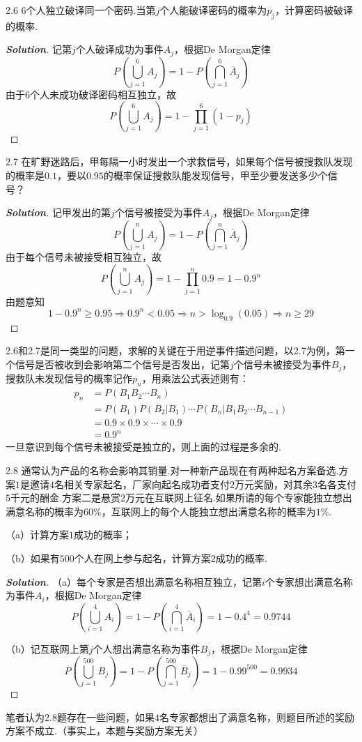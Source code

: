 \documentclass[10pt, a4paper, oneside]{ctexart}
\newenvironment{solution}{\begin{proof}[\bf Solution]}{\end{proof}}
\begin{document}
2.6 $6$个人独立破译同一个密码.当第$j$个人能破译密码的概率为$p_j$，计算密码被破译的概率.
\begin{solution}
记第$j$个人破译成功为事件$A_j$，根据De Morgan定律
\[P(\bigcup\limits_{j = 1}^6 {{A_j}} ) = 1 - P(\bigcap\limits_{j = 1}^6 {{{\overline A }_j}} )\]
由于$6$个人未成功破译密码相互独立，故
\[P(\bigcup\limits_{j = 1}^6 {{A_j}} ) = 1 - \prod\limits_{j = 1}^6 {(1 - {p_j})} \]
\end{solution}

2.7 在旷野迷路后，甲每隔一小时发出一个求救信号，如果每个信号被搜救队发现的概率是$0.1$，要以$0.95$的概率保证搜救队能发现信号，甲至少要发送多少个信号？
\begin{solution}
记甲发出的第$j$个信号被接受为事件$A_j$，根据De Morgan定律
\[P(\bigcup\limits_{j = 1}^n {{A_j}} ) = 1 - P(\bigcap\limits_{j = 1}^n {{{\bar A}_j}} )\]
由于每个信号未被接受相互独立，故
\[P(\bigcup\limits_{j = 1}^n {{A_j}} ) = 1 - \prod\limits_{j = 1}^n {0.9}  = 1 - {0.9^n}\]
由题意知
\[1 - {0.9^n} \geqslant 0.95 \Rightarrow {0.9^n} < 0.05 \Rightarrow n > {\log _{0.9}}(0.05) \Rightarrow n \geqslant 29\]
\end{solution}
\begin{remark}
2.6和2.7是同一类型的问题，求解的关键在于用逆事件描述问题，以2.7为例，第一个信号是否被收到会影响第二个信号是否发出，记第$j$个信号未被接受为事件$B_j$，搜救队未发现信号的概率记作$p_n$，用乘法公式表述则有：
\[
\begin{aligned}
{p_n} &= P({B_1}{B_2} \cdots {B_n})\\
& = P({B_1})P({B_2}|{B_1}) \cdots P({B_n}|{B_1}{B_2} \cdots {B_{n - 1}})\\
& = 0.9\times0.9\times \cdots \times 0.9\\
& = 0.9^n
\end{aligned}
\]
一旦意识到每个信号未被接受是独立的，则上面的过程是多余的.
\end{remark}

2.8 通常认为产品的名称会影响其销量.对一种新产品现在有两种起名方案备选.方案$1$是邀请$4$名相关专家起名，厂家向起名成功者支付$2$万元奖励，对其余$3$名各支付$5$千元的酬金.方案二是悬赏$2$万元在互联网上征名.如果所请的每个专家能独立想出满意名称的概率为$60\%$，互联网上的每个人能独立想出满意名称的概率为$1\%$.

（a）计算方案$1$成功的概率；

（b）如果有$500$个人在网上参与起名，计算方案$2$成功的概率.
\begin{solution}
（a）每个专家是否想出满意名称相互独立，记第$i$个专家想出满意名称为事件$A_i$，根据De Morgan定律
\[P(\bigcup\limits_{i = 1}^4 {{A_i}} ) = 1 - P(\bigcap\limits_{i = 1}^4 {{{\overline A }_i}} ) = 1 - {0.4^4} = 0.9744\]

（b）记互联网上第$j$个人想出满意名称为事件$B_j$，根据De Morgan定律
\[P(\bigcup\limits_{j = 1}^{500} {{B_j}} ) = 1 - P(\bigcap\limits_{j = 1}^{500} {{{\overline B }_j}} ) = 1 - {0.99^{500}} = 0.9934\]
\end{solution}
\begin{remark}
笔者认为2.8题存在一些问题，如果$4$名专家都想出了满意名称，则题目所述的奖励方案不成立.（事实上，本题与奖励方案无关）
\end{remark}
\end{document}
